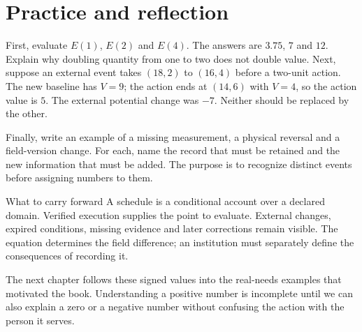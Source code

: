 \section{Practice and reflection}
First, evaluate $E(1)$, $E(2)$ and $E(4)$. The answers are $3.75$, $7$ and $12$. Explain why doubling quantity from one to two does not double value. Next, suppose an external event takes $(18,2)$ to $(16,4)$ before a two-unit action. The new baseline has $V=9$; the action ends at $(14,6)$ with $V=4$, so the action value is $5$. The external potential change was $-7$. Neither should be replaced by the other.

Finally, write an example of a missing measurement, a physical reversal and a field-version change. For each, name the record that must be retained and the new information that must be added. The purpose is to recognize distinct events before assigning numbers to them.

\begin{intuitionbox}{What to carry forward}
A schedule is a conditional account over a declared domain. Verified execution supplies the point to evaluate. External changes, expired conditions, missing evidence and later corrections remain visible. The equation determines the field difference; an institution must separately define the consequences of recording it.
\end{intuitionbox}

The next chapter follows these signed values into the real-needs examples that motivated the book. Understanding a positive number is incomplete until we can also explain a zero or a negative number without confusing the action with the person it serves.
